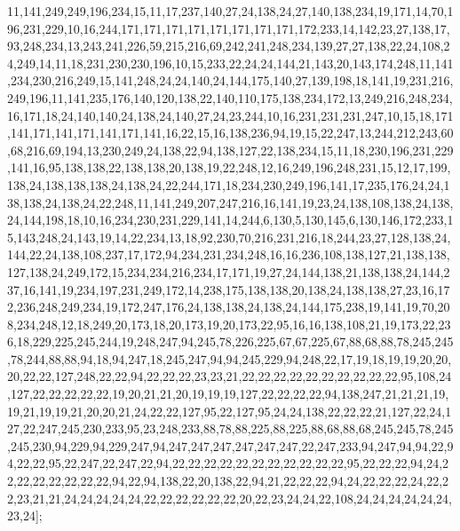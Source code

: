 11,141,249,249,196,234,15,11,17,237,140,27,24,138,24,27,140,138,234,19,171,14,70,196,231,229,10,16,244,171,171,171,171,171,171,171,171,172,233,14,142,23,27,138,17,93,248,234,13,243,241,226,59,215,216,69,242,241,248,234,139,27,27,138,22,24,108,24,249,14,11,18,231,230,230,196,10,15,233,22,24,24,144,21,143,20,143,174,248,11,141,234,230,216,249,15,141,248,24,24,140,24,144,175,140,27,139,198,18,141,19,231,216,249,196,11,141,235,176,140,120,138,22,140,110,175,138,234,172,13,249,216,248,234,16,171,18,24,140,140,24,138,24,140,27,24,23,244,10,16,231,231,231,247,10,15,18,171,141,171,141,171,141,171,141,16,22,15,16,138,236,94,19,15,22,247,13,244,212,243,60,68,216,69,194,13,230,249,24,138,22,94,138,127,22,138,234,15,11,18,230,196,231,229,141,16,95,138,138,22,138,138,20,138,19,22,248,12,16,249,196,248,231,15,12,17,199,138,24,138,138,138,24,138,24,22,244,171,18,234,230,249,196,141,17,235,176,24,24,138,138,24,138,24,22,248,11,141,249,207,247,216,16,141,19,23,24,138,108,138,24,138,24,144,198,18,10,16,234,230,231,229,141,14,244,6,130,5,130,145,6,130,146,172,233,15,143,248,24,143,19,14,22,234,13,18,92,230,70,216,231,216,18,244,23,27,128,138,24,144,22,24,138,108,237,17,172,94,234,231,234,248,16,16,236,108,138,127,21,138,138,127,138,24,249,172,15,234,234,216,234,17,171,19,27,24,144,138,21,138,138,24,144,237,16,141,19,234,197,231,249,172,14,238,175,138,138,20,138,24,138,138,27,23,16,172,236,248,249,234,19,172,247,176,24,138,138,24,138,24,144,175,238,19,141,19,70,208,234,248,12,18,249,20,173,18,20,173,19,20,173,22,95,16,16,138,108,21,19,173,22,236,18,229,225,245,244,19,248,247,94,245,78,226,225,67,67,225,67,88,68,88,78,245,245,78,244,88,88,94,18,94,247,18,245,247,94,94,245,229,94,248,22,17,19,18,19,19,20,20,20,22,22,127,248,22,22,94,22,22,22,23,23,21,22,22,22,22,22,22,22,22,22,22,95,108,24,127,22,22,22,22,22,19,20,21,21,20,19,19,19,127,22,22,22,22,94,138,247,21,21,21,19,19,21,19,19,21,20,20,21,24,22,22,127,95,22,127,95,24,24,138,22,22,22,21,127,22,24,127,22,247,245,230,233,95,23,248,233,88,78,88,225,88,225,88,68,88,68,245,245,78,245,245,230,94,229,94,229,247,94,247,247,247,247,247,247,22,247,233,94,247,94,94,22,94,22,22,95,22,247,22,247,22,94,22,22,22,22,22,22,22,22,22,22,22,95,22,22,22,94,24,22,22,22,22,22,22,22,94,22,94,138,22,20,138,22,94,21,22,22,22,94,24,22,22,22,24,22,22,23,21,21,24,24,24,24,24,22,22,22,22,22,22,20,22,23,24,24,22,108,24,24,24,24,24,24,23,24];

